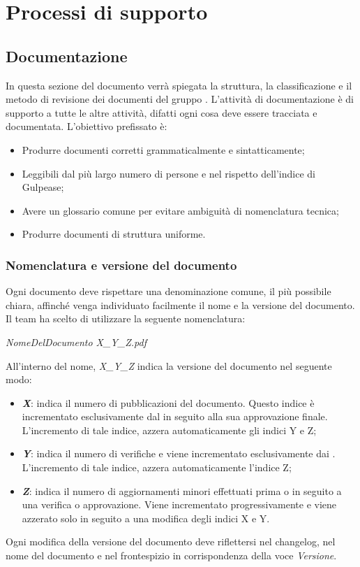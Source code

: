 \newpage

\section{Processi di supporto}

	\subsection{Documentazione}
	In questa sezione del documento verrà spiegata la struttura, la classificazione e il metodo di revisione dei documenti del gruppo \textit{\gruppo}.
	L'attività di documentazione è di supporto a tutte le altre attività, difatti ogni cosa deve essere tracciata e documentata.
	L'obiettivo prefissato è:
	\begin{itemize}
		\item Produrre documenti corretti grammaticalmente e sintatticamente;
		\item Leggibili dal più largo numero di persone e nel rispetto dell'indice di Gulpease;
		\item Avere un glossario comune per evitare ambiguità di nomenclatura tecnica;
		\item Produrre documenti di struttura uniforme.
	\end{itemize}
	
		\subsubsection{Nomenclatura e versione del documento}
		Ogni documento deve rispettare una denominazione comune, il più possibile chiara, affinché venga individuato facilmente il nome e la versione del documento. Il team ha scelto di utilizzare la seguente nomenclatura:
		\begin{center}
			\textit{NomeDelDocumento X\_Y\_Z.pdf}
		\end{center}
		All'interno del nome, \textit{X\_Y\_Z} indica la versione del documento nel seguente modo:
		\begin{itemize}
			\item \textit{\textbf{X}}: indica il numero di pubblicazioni del documento. Questo indice è incrementato esclusivamente dal \textit{\RdP} in seguito alla sua approvazione finale. L’incremento di tale indice, azzera automaticamente gli indici Y e Z;
			\item \textit{\textbf{Y}}: indica il numero di verifiche e viene incrementato esclusivamente dai \textit{\Vers}. L'incremento di tale indice, azzera automaticamente l'indice Z;
			\item \textit{\textbf{Z}}: indica il numero di aggiornamenti minori effettuati prima o in seguito a una verifica o approvazione. Viene incrementato progressivamente e viene azzerato solo in seguito a una modifica degli indici X e Y.
		\end{itemize}
		Ogni modifica della versione del documento deve riflettersi nel changelog, nel nome del documento e nel frontespizio in corrispondenza della voce \textit{Versione}.
	
